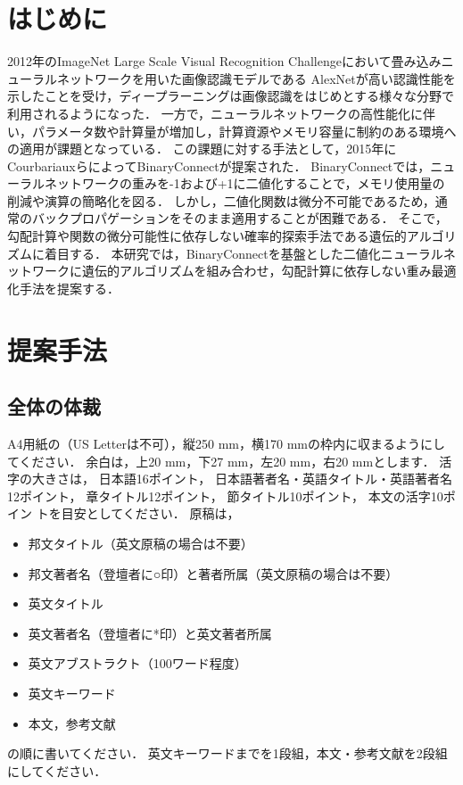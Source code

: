 \documentclass[a4paper]{jarticle}
\begin{document}
\maketitle

\section{はじめに}

2012年のImageNet Large Scale Visual Recognition Challengeにおいて畳み込みニューラルネットワークを用いた画像認識モデルである
AlexNetが高い認識性能を示したことを受け，ディープラーニングは画像認識をはじめとする様々な分野で利用されるようになった．
一方で，ニューラルネットワークの高性能化に伴い，パラメータ数や計算量が増加し，計算資源やメモリ容量に制約のある環境への適用が課題となっている．
この課題に対する手法として，2015年にCourbariauxらによってBinaryConnectが提案された．
BinaryConnectでは，ニューラルネットワークの重みを-1および+1に二値化することで，メモリ使用量の削減や演算の簡略化を図る．
しかし，二値化関数は微分不可能であるため，通常のバックプロパゲーションをそのまま適用することが困難である．
そこで，勾配計算や関数の微分可能性に依存しない確率的探索手法である遺伝的アルゴリズムに着目する．
本研究では，BinaryConnectを基盤とした二値化ニューラルネットワークに遺伝的アルゴリズムを組み合わせ，勾配計算に依存しない重み最適化手法を提案する．

\section{提案手法}

\subsection{全体の体裁}

A4用紙の（US Letterは不可），縦250 mm，横170 mmの枠内に収まるようにし
てください．
余白は，上20 mm，下27 mm，左20 mm，右20 mmとします．
活字の大きさは，
日本語16ポイント，
日本語著者名・英語タイトル・英語著者名12ポイント，
章タイトル12ポイント，
節タイトル10ポイント，
本文の活字10ポイン
トを目安としてください．
原稿は，
%
\begin{itemize}
  \setlength{\topsep}{0pt}
  \setlength{\partopsep}{0pt}
  \setlength{\itemsep}{0pt}
  \setlength{\parsep}{0pt}
  \setlength{\parskip}{1pt plus 1pt minus 1pt}
  \item 邦文タイトル（英文原稿の場合は不要）
  \item 邦文著者名（登壇者に○印）と著者所属（英文原稿の場合は不要）
  \item 英文タイトル
  \item 英文著者名（登壇者に*印）と英文著者所属
  \item 英文アブストラクト（100ワード程度）
  \item 英文キーワード
  \item 本文，参考文献
\end{itemize}
%
の順に書いてください．
英文キーワードまでを1段組，本文・参考文献を2段組にしてください．
\end{document}
